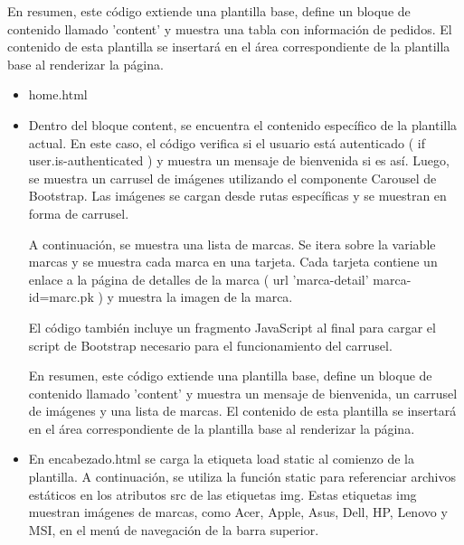 \documentclass{article}
\begin{document}
\begin{itemize}
\begin{itemize}
\begin{itemize}
                    En resumen, este código extiende una plantilla base, define un bloque de contenido llamado 'content' y muestra una tabla con información de pedidos. El contenido de esta plantilla se insertará en el área correspondiente de la plantilla base al renderizar la página.
            \end{itemize}
            
            \begin{itemize}
                \item home.html 
                    \item Dentro del bloque content, se encuentra el contenido específico de la plantilla actual. En este caso, el código verifica si el usuario está autenticado ({ if user.is-authenticated }) y muestra un mensaje de bienvenida si es así. Luego, se muestra un carrusel de imágenes utilizando el componente Carousel de Bootstrap. Las imágenes se cargan desde rutas específicas y se muestran en forma de carrusel.

                    A continuación, se muestra una lista de marcas. Se itera sobre la variable marcas y se muestra cada marca en una tarjeta. Cada tarjeta contiene un enlace a la página de detalles de la marca ({ url 'marca-detail' marca-id=marc.pk }) y muestra la imagen de la marca.

                    El código también incluye un fragmento JavaScript al final para cargar el script de Bootstrap necesario para el funcionamiento del carrusel.

                    En resumen, este código extiende una plantilla base, define un bloque de contenido llamado 'content' y muestra un mensaje de bienvenida, un carrusel de imágenes y una lista de marcas. El contenido de esta plantilla se insertará en el área correspondiente de la plantilla base al renderizar la página.
            \end{itemize}
            
            \begin{itemize}
                \item En encabezado.html se carga la etiqueta { load static } al comienzo de la plantilla. A continuación, se utiliza la función { static } para referenciar archivos estáticos en los atributos src de las etiquetas img. Estas etiquetas img muestran imágenes de marcas, como Acer, Apple, Asus, Dell, HP, Lenovo y MSI, en el menú de navegación de la barra superior.


\end{itemize}
\end{itemize}
\end{itemize}
\end{document}
